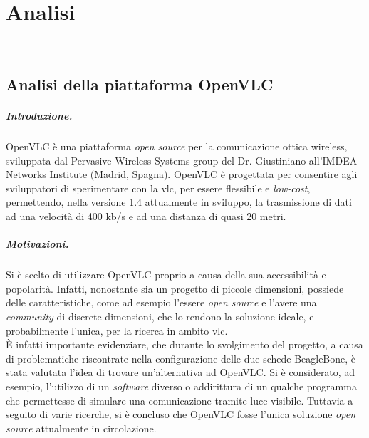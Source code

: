 \chapter{Analisi}
\label{cap:analisi}

\\

\section{Analisi della piattaforma OpenVLC}

\paragraph{Introduzione.}
OpenVLC è una piattaforma \textit{open source} per la comunicazione ottica wireless, sviluppata dal Pervasive Wireless Systems group del Dr. Giustiniano all'IMDEA Networks Institute (Madrid, Spagna).
OpenVLC è progettata per consentire agli sviluppatori di sperimentare con la \gls{vlc}, per essere flessibile e \textit{low-cost}, permettendo, nella versione 1.4 attualmente in sviluppo, la trasmissione di dati ad una velocità di 400 kb/s e ad una distanza di quasi 20 metri.

\paragraph{Motivazioni.}
Si è scelto di utilizzare OpenVLC proprio a causa della sua accessibilità e popolarità. Infatti, nonostante sia un progetto di piccole dimensioni, possiede delle caratteristiche, come ad esempio l'essere \textit{open source} e l'avere una \textit{community} di discrete dimensioni, che lo rendono la soluzione ideale, e probabilmente l'unica, per la ricerca in ambito \gls{vlc}.\\
È infatti importante evidenziare, che durante lo svolgimento del progetto, a causa di problematiche riscontrate nella configurazione delle due schede BeagleBone, è stata valutata l'idea di trovare un'alternativa ad OpenVLC. Si è considerato, ad esempio, l'utilizzo di un \textit{software} diverso o addirittura di un qualche programma che permettesse di simulare una comunicazione tramite luce visibile. Tuttavia a seguito di varie ricerche, si è concluso che OpenVLC fosse l'unica soluzione \textit{open source} attualmente in circolazione.


